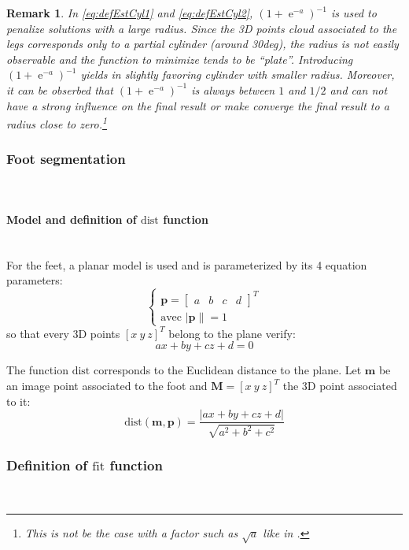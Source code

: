 \documentclass[letterpaper, 10 pt, conference]{ieeeconf}
\newtheorem{rem}{Remark}
\DeclareMathOperator{\e}{e}
\begin{document}
\begin{rem}
In \eqref{eq:defEstCyl1} and \eqref{eq:defEstCyl2}, $(1+\e^{-a})^{-1}$ is used to penalize solutions with a large radius. Since the 3D points cloud associated to the legs corresponds only to a partial cylinder (around 30deg), the radius is not easily observable and the function to minimize tends to be ``plate''. Introducing $(1+\e^{-a})^{-1}$ yields in slightly favoring cylinder with smaller radius. Moreover, it can be obserbed that $(1+\e^{-a})^{-1}$ is always between $1$ and $1/2$ and can not have a strong influence on the final result or make converge the final result to a radius close to zero.\footnote{This is not be the case with a factor such as $\sqrt{a}$ like in \cite{lala}.}
\end{rem}
\subsubsection{Foot segmentation}~\\
\label{subsub:footSegmentation}
\paragraph{Model and definition of $\mathrm{dist}$ function}~\\
For the feet, a planar model is used and is parameterized by its 4 equation parameters:
\begin{equation}
	\left\{
	\begin{array}{l}
		\mathbf{p} = 
		\begin{bmatrix}
			a & b & c & d
		\end{bmatrix}^T\\
	\mbox{avec } |\mathbf{p}\| = 1 
	\end{array}
	\right.
\end{equation}
so that every 3D points $[x\ y\ z]^T$ belong to the plane verify:
\begin{equation}
	ax+by+cz+d=0
\end{equation}

The function $\mathrm{dist}$ corresponds to the Euclidean distance to the plane. Let $\mathbf{m}$ be an image point associated to the foot and $\mathbf{M} = [x\ y \ z]^T$ the 3D point associated to it:
\begin{equation}
	\mathrm{dist}(\mathbf{m},\mathbf{p}) = 
	\frac{|ax+by+cz+d|}
	{\sqrt{a^2+b^2+c^2}}
\end{equation}


\subsubsection{Definition of $\mathrm{fit}$ function}~\\
\end{document}

